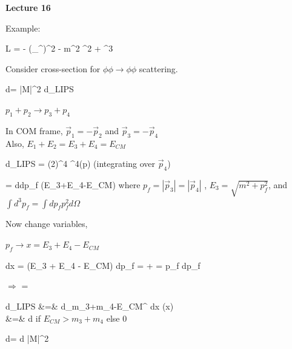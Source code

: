 



\thispagestyle{fancy}

\begin{center}
{\huge \textbf{Lecture 16}}
\end{center}

{\fontsize{14}{16}\selectfont


Example: 

\be
L = - (\partial_\mu \phi \partial^\mu \phi)^2 - m^2 \phi^2 + \phi^3
\ee

Consider cross-section for $\phi\phi\rightarrow\phi\phi$ scattering.

\be
d\sigma =  |M|^2 d\Pi_{LIPS}
\ee

$p_1 + p_2 \rightarrow p_3 + p_4$


In COM frame,  $\vec{p}_1 = -\vec{p}_2$ and $\vec{p}_3 = -\vec{p}_4$\\
Also, $E_1 + E_2 = E_3+E_4 = E_{CM}$

\be
d\Pi_{LIPS} = (2\pi)^4 \delta^4(\sum p)    
\ee
(integrating over $\vec{p}_4$)

\be
=  d\Omega \int dp_f   \delta(E_3+E_4-E_{CM})
\ee
where $p_f = |\vec{p}_3| = |\vec{p}_4|$ , $E_3 = \sqrt{m^2 + p_f^2}$, and $\int d^3p_f = \int dp_f p_f^2 d\Omega$

Now change variables, 

$p_f \rightarrow x = E_3 + E_4 - E_{CM}$

\be
dx = (E_3 + E_4 - E_{CM}) dp_f =  +   =  p_f dp_f
\ee

$\Rightarrow$
\be
{} = 
\ee


\bea
d\Pi_{LIPS} &=&  d\Omega \int_{m_3+m_4-E_{CM}}^{\infty} dx  \delta(x) \\ 
&=&  d\Omega {} \textrm{if $E_{CM} > m_3 + m_4$ else 0 }
\eea

\be
d\sigma =  d\Omega {} |M|^2
\ee

}
